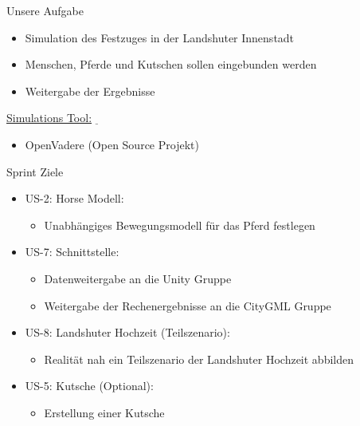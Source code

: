 \newcommand\tab[1][1cm]{\hspace*{#1}}
\graphicspath{{images/}{images/logos/}}
\begin{frame}{Unsere Aufgabe}
	\begin{center}
		\begin{itemize}
			\item Simulation des Festzuges in der Landshuter Innenstadt
			\item Menschen, Pferde und Kutschen sollen eingebunden werden
			\item Weitergabe der Ergebnisse
		\end{itemize}
	
\end{center}
	\underline{Simulations Tool:} $\underline{}$
	\begin{itemize}
		\item OpenVadere (Open Source Projekt) 
	\end{itemize}
\end{frame}

\begin{frame}{Sprint Ziele}
	\begin{center}
		\begin{itemize}
			\item US-2: Horse Modell:
			\begin{itemize}
				\item Unabhängiges Bewegungsmodell für das Pferd festlegen
			\end{itemize}
			\item US-7: Schnittstelle:
			\begin{itemize}
				\item Datenweitergabe an die Unity Gruppe
				\item Weitergabe der Rechenergebnisse an die CityGML Gruppe
			\end{itemize} 
			\item US-8: Landshuter Hochzeit (Teilszenario):
			\begin{itemize}
				\item Realität nah ein Teilszenario der Landshuter Hochzeit abbilden
			\end{itemize}
			\item US-5: Kutsche (Optional): 
				\begin{itemize}
				\item Erstellung einer Kutsche
			\end{itemize}
		\end{itemize}
	\end{center}
\end{frame}

